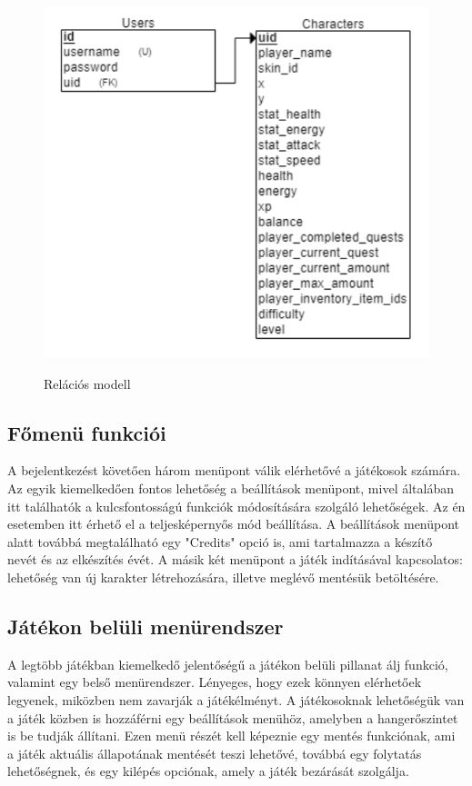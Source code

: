 \begin{figure}[H]
    \centering
    \includegraphics[width=10.0truecm]{images/RelationModell.png}
    \caption{Relációs modell}
    \label{fig:Relációs modell}\cite{Relációs-modell}
\end{figure}

\subsection{Főmenü funkciói}

\indent \indent A bejelentkezést követően három menüpont válik elérhetővé a játékosok számára. Az egyik kiemelkedően fontos lehetőség a beállítások menüpont, mivel általában itt találhatók a kulcsfontosságú funkciók módosítására szolgáló lehetőségek. Az én esetemben itt érhető el a teljesképernyős mód beállítása. A beállítások menüpont alatt továbbá megtalálható egy "Credits" opció is, ami tartalmazza a készítő nevét és az elkészítés évét. A másik két menüpont a játék indításával kapcsolatos: lehetőség van új karakter létrehozására, illetve meglévő mentésük betöltésére.

\subsection{Játékon belüli menürendszer}

\indent \indent A legtöbb játékban kiemelkedő jelentőségű a játékon belüli pillanat álj funkció, valamint egy belső menürendszer. Lényeges, hogy ezek könnyen elérhetőek legyenek, miközben nem zavarják a játékélményt. A játékosoknak lehetőségük van a játék közben is hozzáférni egy beállítások menühöz, amelyben a hangerőszintet is be tudják állítani. Ezen menü részét kell képeznie egy mentés funkciónak, ami a játék aktuális állapotának mentését teszi lehetővé, továbbá egy folytatás lehetőségnek, és egy kilépés opciónak, amely a játék bezárását szolgálja.


